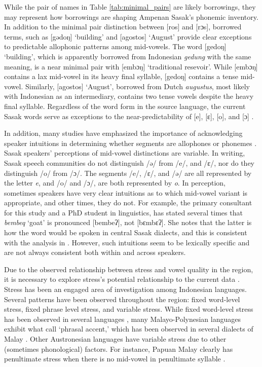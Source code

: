 \documentclass[12pt]{ouparticle}
\begin{document}
While the pair of names in Table \ref{tab:minimal_pairs} are likely borrowings, they may represent how borrowings are shaping Ampenan Sasak's phonemic inventory. In addition to the minimal pair distinction between [ros] and [rɔs], borrowed terms, such as [gədoŋ] `building’ and [agostos] `August' provide clear exceptions to predictable allophonic patterns among mid-vowels. The word [gedoŋ] `building', which is apparently borrowed from Indonesian \textit{gedung} with the same meaning, is a near minimal pair with [embɔŋ] `traditional resevoir'. While [embɔŋ] contains a lax mid-vowel in its heavy final syllable, [gedoŋ] contains a tense mid-vowel. Similarly, [agostos] `August', borrowed from Dutch \textit{augustus}, most likely with Indonesian as an intermediary, contains two tense vowels despite the heavy final syllable. Regardless of the word form in the source language, the current Sasak words serve as exceptions to the near-predictability of [e], [ɛ], [o], and [ɔ] .

In addition, many studies have emphasized the importance of acknowledging speaker intuitions in determining whether segments are allophones or phonemes \citep{hualde2005,scobbie2008}. Sasak speakers' perceptions of mid-vowel distinctions are variable. In writing, Sasak speech communities do not distinguish /ə/ from /e/, and /ɛ/, nor do they distinguish /o/ from /ɔ/. The segments /e/, /ɛ/, and /ə/ are all represented by the letter \textit{e}, and /o/ and /ɔ/, are both represented by \textit{o}. In perception, sometimes speakers have very clear intuitions as to which mid-vowel variant is appropriate, and other times, they do not. For example, the primary consultant for this study and a PhD student in linguistics, has stated several times that \textit{bembeq} `goat'  is pronounced [bembeʔ], not [bɛmbɛʔ]. She notes that the latter is how the word would be spoken in central Sasak dialects, and this is consistent with the analysis in \citet[]{chahal1998}. However, such intuitions seem to be lexically specific and are not always consistent both within and across speakers. 

Due to the observed relationship between stress and vowel quality in the region, it is necessary to explore stress's potential relationship to the current data  \citep{chahal1998, kaland2019}. Stress has been an engaged area of investigation among Indonesian languages. Several patterns have been observed throughout the region: fixed word-level stress, fixed phrase level stress, and variable stress. While fixed word-level stress has been observed in several languages \citep[e.g][]{mcdonnell2016}, many Malayo-Polynesian languages exhibit what \citet{goedemans2014} call `phrasal accent,' which has been observed in several dialects of Malay \citep{vanzanten1998, vanzanten2004, maskikit2016}. Other Austronesian languages have variable stress due to other (sometimes phonological) factors. For instance, Papuan Malay clearly has penultimate stress when there is no mid-vowel in penultimate syllable \citep{kaland2019}.
\end{document}
